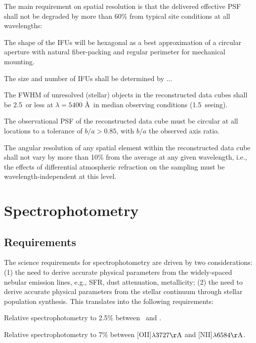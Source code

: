 \documentclass[11pt,a4paper,twoside,onecolumn,openany,final,oldfontcommands]{memoir}
\begin{document}
\medskip
\noindent The main requirement on spatial resolution is that the delivered effective PSF shall not be degraded by more than 60\% from typical site conditions at all wavelengths:


\begin{requirement}

\reqitem The shape of the IFUs will be hexagonal as a best approximation of a circular aperture with natural fiber-packing and regular perimeter for mechanical mounting.

\reqitem The size and number of IFUs shall be determined by ...

\reqitem The FWHM of unresolved (stellar) objects in the reconstructed data cubes shall be 2.5\arcsec\ or less at $\lambda = 5400$ \AA\ in median observing conditions (1.5\arcsec\ seeing).

\reqitem The observational PSF of the reconstructed data cube must be circular at all locations to a tolerance of $b/a > 0.85$, with $b/a$ the observed axis ratio.

\reqitem The angular resolution of any spatial element within the reconstructed data cube shall not vary by more than 10\% from the average at any given wavelength, i.e., the effects of differential atmospheric refraction on the sampling must be wavelength-independent at this level.

\end{requirement}

\chapter{Spectrophotometry} \label{sec:spectrophotometry}

\section{Requirements}

The science requirements for spectrophotometry are driven by two considerations: (1) the need to derive accurate physical parameters from the widely-spaced nebular emission lines, e.g., SFR, dust attenuation, metallicity; (2) the need to derive accurate physical parameters from the stellar continuum through stellar population synthesis. This translates into the following requirements:

\begin{requirement}

\reqitem Relative spectrophotometry to 2.5\% between \Halpha\ and \Hbeta.
    
\reqitem Relative spectrophotometry to 7\% between [OII]$\lambda3727{\rm \AA}$ and [NII]$\lambda6584{\rm \AA}$. 
    
\end{requirement}
\end{document}
